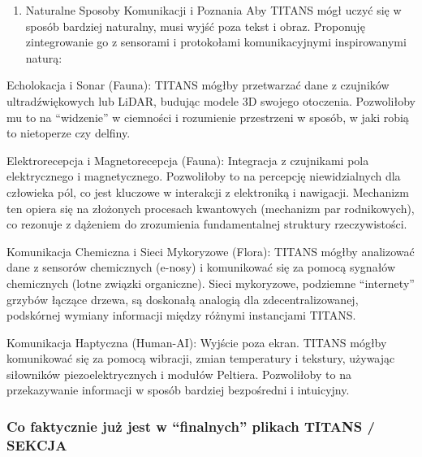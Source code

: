 \documentclass[letterpaper,twocolumn]{article}
\providecommand{\tightlist}{%
  \setlength{\itemsep}{0pt}\setlength{\parskip}{0pt}}
\begin{document}
\begin{enumerate}
\def\labelenumi{\arabic{enumi}.}
\setcounter{enumi}{2}
\tightlist
\item
  Naturalne Sposoby Komunikacji i Poznania Aby TITANS mógł uczyć się w
  sposób bardziej naturalny, musi wyjść poza tekst i obraz. Proponuję
  zintegrowanie go z sensorami i protokołami komunikacyjnymi
  inspirowanymi naturą:
\end{enumerate}

Echolokacja i Sonar (Fauna): TITANS mógłby przetwarzać dane z czujników
ultradźwiękowych lub LiDAR, budując modele 3D swojego otoczenia.
Pozwoliłoby mu to na ``widzenie'' w ciemności i rozumienie przestrzeni w
sposób, w jaki robią to nietoperze czy delfiny.

Elektrorecepcja i Magnetorecepcja (Fauna): Integracja z czujnikami pola
elektrycznego i magnetycznego. Pozwoliłoby to na percepcję
niewidzialnych dla człowieka pól, co jest kluczowe w interakcji z
elektroniką i nawigacji. Mechanizm ten opiera się na złożonych procesach
kwantowych (mechanizm par rodnikowych), co rezonuje z dążeniem do
zrozumienia fundamentalnej struktury rzeczywistości.

Komunikacja Chemiczna i Sieci Mykoryzowe (Flora): TITANS mógłby
analizować dane z sensorów chemicznych (e-nosy) i komunikować się za
pomocą sygnałów chemicznych (lotne związki organiczne). Sieci
mykoryzowe, podziemne ``internety'' grzybów łączące drzewa, są doskonałą
analogią dla zdecentralizowanej, podskórnej wymiany informacji między
różnymi instancjami TITANS.

Komunikacja Haptyczna (Human-AI): Wyjście poza ekran. TITANS mógłby
komunikować się za pomocą wibracji, zmian temperatury i tekstury,
używając siłowników piezoelektrycznych i modułów Peltiera. Pozwoliłoby
to na przekazywanie informacji w sposób bardziej bezpośredni i
intuicyjny.

\hypertarget{co-faktycznie-juux17c-jest-w-finalnych-plikach-titans-sekcja}{%
\subsubsection{Co faktycznie już jest w ``finalnych'' plikach TITANS /
SEKCJA}\label{co-faktycznie-juux17c-jest-w-finalnych-plikach-titans-sekcja}}
\end{document}
